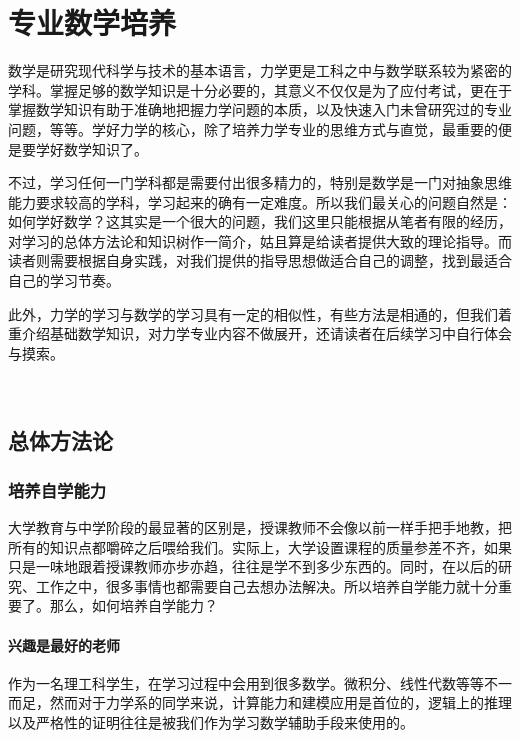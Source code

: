 \restoregeometry
\section{专业数学培养}

 {\itshapeCJK
  数学是研究现代科学与技术的基本语言，力学更是工科之中与数学联系较为紧密的学科。掌握足够的数学知识是十分必要的，其意义不仅仅是为了应付考试，更在于掌握数学知识有助于准确地把握力学问题的本质，以及快速入门未曾研究过的专业问题，等等。学好力学的核心，除了培养力学专业的思维方式与直觉，最重要的便是要学好数学知识了。

  不过，学习任何一门学科都是需要付出很多精力的，特别是数学是一门对抽象思维能力要求较高的学科，学习起来的确有一定难度。所以我们最关心的问题自然是：如何学好数学？这其实是一个很大的问题，我们这里只能根据从笔者有限的经历，对学习的总体方法论和知识树作一简介，姑且算是给读者提供大致的理论指导。而读者则需要根据自身实践，对我们提供的指导思想做适合自己的调整，找到最适合自己的学习节奏。

  此外，力学的学习与数学的学习具有一定的相似性，有些方法是相通的，但我们着重介绍基础数学知识，对力学专业内容不做展开，还请读者在后续学习中自行体会与摸索。
 }

~\\

\subsection{总体方法论}

\subsubsection{培养自学能力}

大学教育与中学阶段的最显著的区别是，授课教师不会像以前一样手把手地教，把所有的知识点都嚼碎之后喂给我们。实际上，大学设置课程的质量参差不齐，如果只是一味地跟着授课教师亦步亦趋，往往是学不到多少东西的。同时，在以后的研究、工作之中，很多事情也都需要自己去想办法解决。所以培养自学能力就十分重要了。那么，如何培养自学能力？

\paragraph{兴趣是最好的老师}

作为一名理工科学生，在学习过程中会用到很多数学。微积分、线性代数等等不一而足，然而对于力学系的同学来说，计算能力和建模应用是首位的，逻辑上的推理以及严格性的证明往往是被我们作为学习数学辅助手段来使用的。

